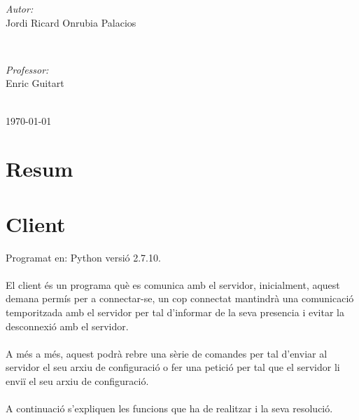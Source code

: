 \documentclass[11pt]{article}
\begin{document}
\begin{titlepage}
\begin{minipage}{0.4\textwidth}
\begin{flushleft} \large
\emph{Autor:}\\
Jordi Ricard Onrubia Palacios %
\end{flushleft}
\end{minipage}
~
\begin{minipage}{0.4\textwidth}
\begin{flushright} \large
\emph{Professor:} \\
Enric Guitart %
\end{flushright}
\end{minipage}\\[4cm]

{\large \today}\\[3cm] %
\vfill %
\end{titlepage}

\newpage
\section*{Resum}
\justify
\thispagestyle{empty}

\newpage
\thispagestyle{empty}
\tableofcontents


\newpage
\clearpage
{}
\section{Client}
\justify
Programat en: Python versió 2.7.10.
\\\\
El client és un programa què es comunica amb el servidor, inicialment, aquest demana permís per a connectar-se, un cop connectat mantindrà una comunicació temporitzada amb el servidor per tal d'informar de la seva presencia i evitar la desconnexió amb el servidor.
\\\\
A més a més, aquest podrà rebre una sèrie de comandes per tal d'enviar al servidor el seu arxiu de configuració o fer una petició per tal que el servidor li enviï el seu arxiu de configuració.
\\\\
A continuació s'expliquen les funcions que ha de realitzar i la seva resolució.
\end{document}
